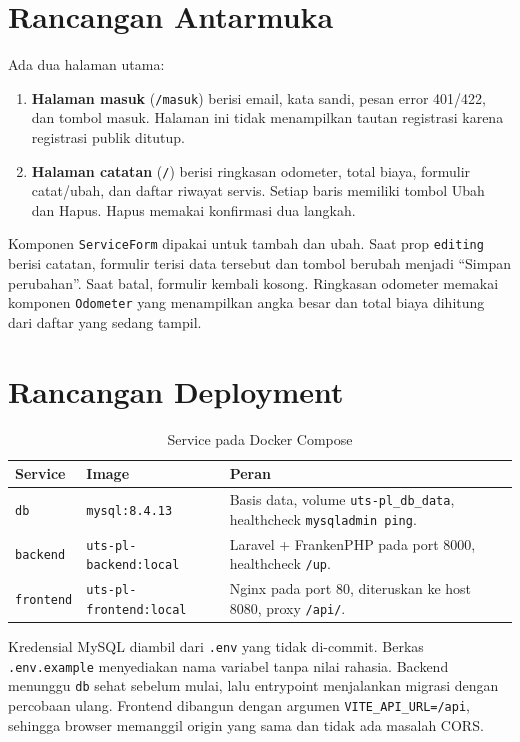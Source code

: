 \documentclass[12pt,a4paper,oneside]{book}
\begin{document}
\section{Rancangan Antarmuka}

Ada dua halaman utama:

\begin{enumerate}[leftmargin=1.2cm]
  \item \textbf{Halaman masuk} (\texttt{/masuk}) berisi email, kata sandi, pesan
        error 401/422, dan tombol masuk. Halaman ini tidak menampilkan tautan
        registrasi karena registrasi publik ditutup.
  \item \textbf{Halaman catatan} (\texttt{/}) berisi ringkasan odometer, total
        biaya, formulir catat/ubah, dan daftar riwayat servis. Setiap baris memiliki
        tombol Ubah dan Hapus. Hapus memakai konfirmasi dua langkah.
\end{enumerate}

Komponen \texttt{ServiceForm} dipakai untuk tambah dan ubah. Saat prop
\texttt{editing} berisi catatan, formulir terisi data tersebut dan tombol berubah
menjadi ``Simpan perubahan''. Saat batal, formulir kembali kosong. Ringkasan
odometer memakai komponen \texttt{Odometer} yang menampilkan angka besar dan
total biaya dihitung dari daftar yang sedang tampil.

\section{Rancangan Deployment}

\begin{table}[H]
\centering
\caption{Service pada Docker Compose}
\label{tab:compose}
\begin{tabularx}{\textwidth}{@{}l l X@{}}
\toprule
\textbf{Service} & \textbf{Image} & \textbf{Peran} \\
\midrule
\texttt{db} & \texttt{mysql:8.4.13} & Basis data, volume \texttt{uts-pl\_db\_data}, healthcheck \texttt{mysqladmin ping}. \\
\texttt{backend} & \texttt{uts-pl-backend:local} & Laravel + FrankenPHP pada port 8000, healthcheck \texttt{/up}. \\
\texttt{frontend} & \texttt{uts-pl-frontend:local} & Nginx pada port 80, diteruskan ke host 8080, proxy \texttt{/api/}. \\
\bottomrule
\end{tabularx}
\end{table}

Kredensial MySQL diambil dari \texttt{.env} yang tidak di-commit. Berkas
\texttt{.env.example} menyediakan nama variabel tanpa nilai rahasia. Backend
menunggu \texttt{db} sehat sebelum mulai, lalu entrypoint menjalankan migrasi
dengan percobaan ulang. Frontend dibangun dengan argumen \texttt{VITE\_API\_URL=/api},
sehingga browser memanggil origin yang sama dan tidak ada masalah CORS.
\end{document}

